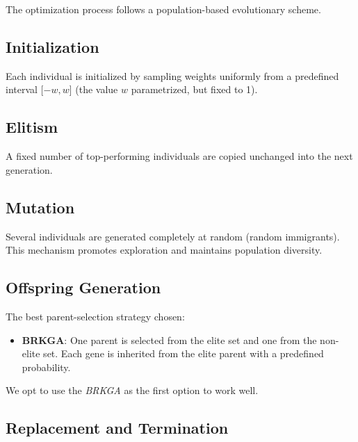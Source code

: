 \documentclass[11pt,a4paper]{article}
\begin{document}
The optimization process follows a population-based evolutionary scheme.

\subsection{Initialization}

Each individual is initialized by sampling weights uniformly from a predefined interval [$-w, w$] (the value $w$ parametrized, but fixed to 1).

\subsection{Elitism}

A fixed number of top-performing individuals are copied unchanged into the next generation.

\subsection{Mutation}

Several individuals are generated completely at random (random immigrants). This mechanism promotes exploration and maintains population diversity.

\subsection{Offspring Generation}

The best parent-selection strategy chosen:

\begin{itemize}
    \item \textbf{BRKGA}: One parent is selected from the elite set and one from the non-elite set. Each gene is inherited from the elite parent with a predefined probability.
\end{itemize}

We opt to use the \textit{BRKGA} as the first option to work well. 


\subsection{Replacement and Termination}
\end{document}

